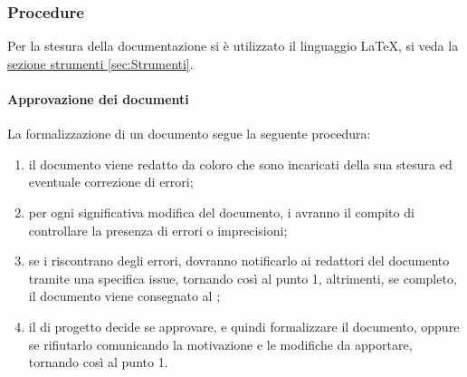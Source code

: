 \subsubsection{Procedure}
Per la stesura della documentazione si è utilizzato il linguaggio \LaTeX{}, si veda la \hyperref[sec:Strumenti]{sezione strumenti \ref*{sec:Strumenti}}.
\paragraph{Approvazione dei documenti}
La formalizzazione di un documento segue la seguente procedura:
\begin{enumerate}
	\item il documento viene redatto da coloro che sono incaricati della sua stesura ed eventuale correzione di errori;
	\item per ogni significativa modifica del documento, i \VERP{} avranno il compito di controllare la presenza di errori o imprecisioni;
	\item se i \VERP{} riscontrano degli errori, dovranno notificarlo ai redattori del documento tramite una specifica issue, tornando così al punto 1, altrimenti, se completo, il documento viene consegnato al \RESP{};
	\item il \RESP{} di progetto decide se approvare, e quindi formalizzare il documento, oppure se rifiutarlo comunicando la motivazione e le modifiche da apportare, tornando così al punto 1.
\end{enumerate}
